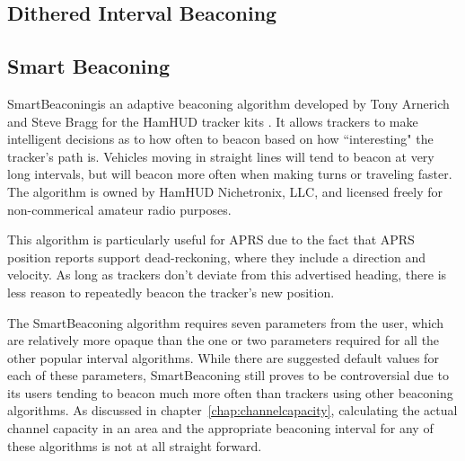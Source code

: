 \subsection{Dithered Interval Beaconing}

\subsection{Smart Beaconing}

SmartBeaconing\texttrademark is an adaptive beaconing algorithm developed
by Tony Arnerich and Steve Bragg for the HamHUD tracker kits \cite{smartbeacon}.
It allows trackers to make intelligent decisions as to how often to beacon
based on how ``interesting" the tracker's path is. 
Vehicles moving in straight lines will tend to beacon at very long intervals,
but will beacon more often when making turns or traveling faster.
The algorithm is owned by HamHUD Nichetronix, LLC, and licensed freely
for non-commerical amateur radio purposes.

This algorithm is particularly useful for APRS due to the fact that APRS
position reports support dead-reckoning, where they include a direction and 
velocity.
As long as trackers don't deviate from this advertised heading, there is
less reason to repeatedly beacon the tracker's new position.

The SmartBeaconing algorithm requires seven parameters 
from the user\cite{smartbeaconwiki},
which are relatively more opaque than the one or two parameters required for
all the other popular interval algorithms. 
While there are suggested default values for each of these parameters, 
SmartBeaconing still proves to be controversial due to its users tending to
beacon much more often than 
trackers using other beaconing algorithms\cite{smartbeaconemail1}.
As discussed in chapter~\ref{chap:channelcapacity}, calculating the 
actual channel capacity in an area and the appropriate beaconing interval
for any of these algorithms is not at all straight forward.

